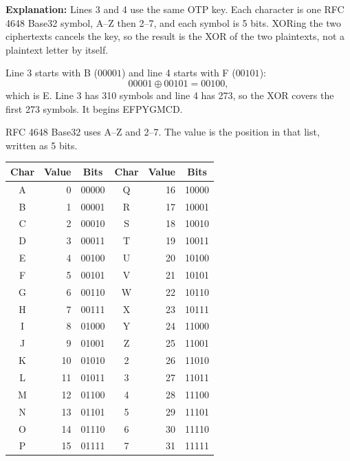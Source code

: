 \documentclass[12pt]{article}
\begin{document}
\begin{answer}
    \textbf{Explanation:}
    Lines 3 and 4 use the same OTP key. Each character is one RFC 4648 Base32 symbol, A--Z then 2--7, and each symbol is 5 bits. XORing the two ciphertexts cancels the key, so the result is the XOR of the two plaintexts, not a plaintext letter by itself.

    Line 3 starts with B (\(00001\)) and line 4 starts with F (\(00101\)):
    \[
    00001 \oplus 00101 = 00100,
    \]
    which is E. Line 3 has 310 symbols and line 4 has 273, so the XOR covers the first 273 symbols. It begins EFPYGMCD.

    \smallskip
    {\scriptsize\ttfamily{}}

    \medskip
    RFC 4648 Base32 uses A--Z and 2--7. The value is the position in that list, written as 5 bits.

    \begin{center}
    \scriptsize
    \setlength{\tabcolsep}{4pt}
    \begin{tabular}{c r c c r c}
    \hline
    Char & Value & Bits & Char & Value & Bits \\
    \hline
    A & 0 & 00000 & Q & 16 & 10000 \\
    B & 1 & 00001 & R & 17 & 10001 \\
    C & 2 & 00010 & S & 18 & 10010 \\
    D & 3 & 00011 & T & 19 & 10011 \\
    E & 4 & 00100 & U & 20 & 10100 \\
    F & 5 & 00101 & V & 21 & 10101 \\
    G & 6 & 00110 & W & 22 & 10110 \\
    H & 7 & 00111 & X & 23 & 10111 \\
    I & 8 & 01000 & Y & 24 & 11000 \\
    J & 9 & 01001 & Z & 25 & 11001 \\
    K & 10 & 01010 & 2 & 26 & 11010 \\
    L & 11 & 01011 & 3 & 27 & 11011 \\
    M & 12 & 01100 & 4 & 28 & 11100 \\
    N & 13 & 01101 & 5 & 29 & 11101 \\
    O & 14 & 01110 & 6 & 30 & 11110 \\
    P & 15 & 01111 & 7 & 31 & 11111 \\
    \hline
    \end{tabular}
    \end{center}


\end{answer}
\end{document}

